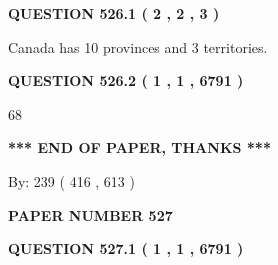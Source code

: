 \documentclass[12pt]{article}
\begin{document}
   
  
\vspace{0.2in}
  
{\textbf{\Large{QUESTION
526.1 
 ( 2 , 2 , 3 )
}}}
  
  
 
 
\noindent{}
 
 
Canada has 10  provinces and 3 territories.
 
 
 
 
  
\vspace{0.2in}
  
{\textbf{\Large{QUESTION
526.2 
 ( 1 , 1 , 6791 )
}}}
  
  
 
 
\noindent{}

68
 
 
   
   
 \vspace{0.2in}
 
   
   
   
   
\vspace{1.0in} 
{\textbf{\large{ *** END OF PAPER, THANKS *** }}} 
   
   
\hspace{1.0in} By: 
 239 ( 416 ,  613 )
   
   
   
   
\newpage 
\setcounter{page}{ 
   527001 } 
   
   
   
   
 {\textbf{ \Large{ PAPER NUMBER  527  }}}
   
   
\vspace{0.2in}
   
   
   
   
   
   
 \vspace{0.2in}
 
 
 
 
   
   
  
\vspace{0.2in}
  
{\textbf{\Large{QUESTION
527.1 
 ( 1 , 1 , 6791 )
}}}
  
\end{document}
